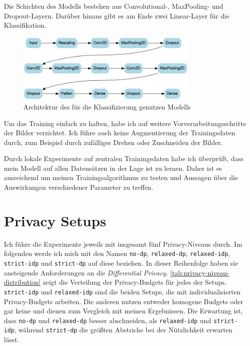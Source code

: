 Die Schichten des Modells bestehen aus Convolutional-, MaxPooling- und Dropout-Layern. Darüber hinaus gibt es am Ende zwei Linear-Layer für die Klassifikation.

\begin{figure}[tb]
	\centering
	\includegraphics[width=0.8\textwidth]{Bilder/model_architecture_1.png}
	\caption{Architektur des für die Klassifizierung genutzen Modells}
	\label{fig:model-architecture}
\end{figure}

Um das Training einfach zu halten, habe ich auf weitere Vorverarbeitungsschritte der Bilder verzichtet. Ich führe auch keine Augmentierung der Trainingsdaten durch, zum Beispiel durch zufälliges Drehen oder Zuschneiden der Bilder.

Durch lokale Experimente auf zentralen Trainingsdaten habe ich überprüft, dass mein Modell auf allen Datensätzen in der Lage ist zu lernen. Daher ist es ausreichend um meinen Trainingsalgorithmus zu testen und Aussagen über die Auswirkungen verschiedener Parameter zu treffen.

\section{Privacy Setups}
Ich führe die Experimente jeweils mit insgesamt fünf Privacy-Niveaus durch. Im folgenden werde ich mich mit den Namen \texttt{no-dp}, \texttt{relaxed-dp}, \texttt{relaxed-idp}, \texttt{strict-idp} und \texttt{strict-dp} auf diese beziehen. In dieser Reihenfolge haben sie ansteigende Anforderungen an die \textit{Differential Privacy}. \autoref{tab:privacy-niveau-distribution} zeigt die Verteilung der Privacy-Budgets für jedes der Setups. \texttt{strict-idp} und \texttt{relaxed-idp} sind die beiden Setups, die mit individualisierten Privacy-Budgets arbeiten. Die anderen nutzen entweder homogene Budgets oder gar keine und dienen zum Vergleich mit meinen Ergebnissen. Die Erwartung ist, dass \texttt{no-dp} und \texttt{relaxed-dp} besser abschneiden, als \texttt{relaxed-idp} und \texttt{strict-idp}, während \texttt{strict-dp} die größten Abstriche bei der Nützlichkeit erwarten lässt.

